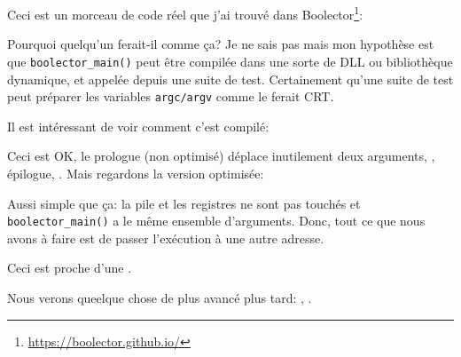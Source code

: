 \label{Boolector}

Ceci est un morceau de code réel que j'ai trouvé dans Boolector\footnote{\url{https://boolector.github.io/}}:



Pourquoi quelqu'un ferait-il comme ça?
Je ne sais pas mais mon hypothèse est que \verb|boolector_main()| peut être compilée
dans une sorte de DLL ou bibliothèque dynamique, et appelée depuis une suite de test.
Certainement qu'une suite de test peut préparer les variables \verb|argc/argv| comme
le ferait \ac{CRT}.

Il est intéressant de voir comment c'est compilé:



Ceci est OK, le prologue (non optimisé) déplace inutilement deux arguments,
, épilogue, .
Mais regardons la version optimisée:



Aussi simple que ça: la pile et les registres ne sont pas touchés et \verb|boolector_main()|
a le même ensemble d'arguments.
Donc, tout ce que nous avons à faire est de passer l'exécution à une autre adresse.

Ceci est proche d'une .

Nous verons queelque chose de plus avancé plus tard: , .
